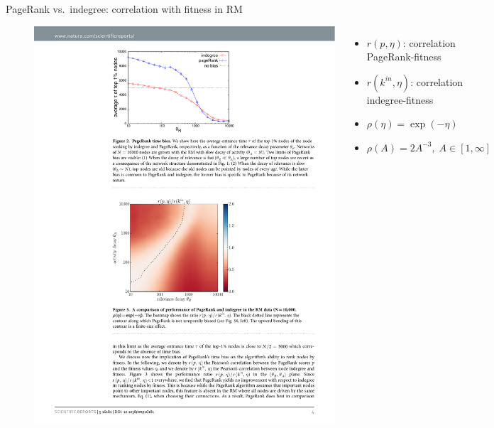 \begin{frame}{PageRank vs.\ indegree: correlation with fitness in RM}
    \begin{figure}
        \begin{columns}

            \includegraphics[width=1.0\textwidth]{figures/PageRankRM_heatmap}


            \begin{footnotesize}
                \begin{itemize}
                    \item $r(p, \eta)$: correlation PageRank-fitness
                    \item $r(k^{in}, \eta)$: correlation indegree-fitness
                \end{itemize}
            \begin{itemize}
                \item $\rho(\eta) = \exp(-\eta)$
                \item $\rho(A) = 2A^{-3}, \; A \in [1, \infty]$
            \end{itemize}
        \end{footnotesize}
        \end{columns}


\end{figure}
\end{frame}
